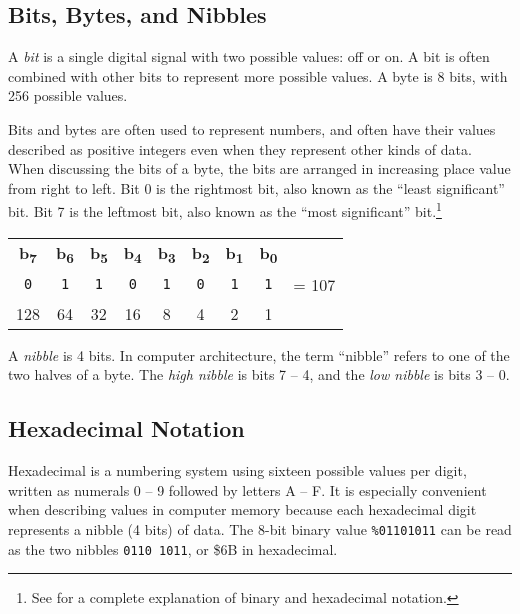 \subsection{Bits, Bytes, and Nibbles}

A {\em bit} is a single digital signal with two possible values: off or on. A
bit is often combined with other bits to represent more possible values. A byte
is 8 bits, with 256 possible values.

Bits and bytes are often used to represent numbers, and often have their
values described as positive integers even when they represent other kinds of
data. When discussing the bits of a byte, the bits are arranged in increasing
place value from right to left. Bit 0 is the rightmost bit, also known as the
``least significant'' bit.  Bit 7 is the leftmost bit, also known as the
``most significant'' bit.\footnote{See
 for a complete explanation of
binary and hexadecimal notation.}

\begin{center}
\begin{tabular}{ccccccccl}
{\bf b\textsubscript{7}} &
{\bf b\textsubscript{6}} &
{\bf b\textsubscript{5}} &
{\bf b\textsubscript{4}} &
{\bf b\textsubscript{3}} &
{\bf b\textsubscript{2}} &
{\bf b\textsubscript{1}} &
{\bf b\textsubscript{0}} & \\
\huge\texttt{0} &
\huge\texttt{1} &
\huge\texttt{1} &
\huge\texttt{0} &
\huge\texttt{1} &
\huge\texttt{0} &
\huge\texttt{1} &
\huge\texttt{1} & = 107 \\
\small{}128 &
\small{}64 &
\small{}32 &
\small{}16 &
\small{}8 &
\small{}4 &
\small{}2 &
\small{}1 & \\
\end{tabular}
\end{center}

A {\em nibble} is 4 bits. In computer architecture, the term ``nibble'' refers
to one of the two halves of a byte. The {\em high nibble} is bits 7 -- 4, and
the {\em low nibble} is bits 3 -- 0.

\subsection{Hexadecimal Notation}

Hexadecimal is a numbering system using sixteen possible values per digit,
written as numerals 0 -- 9 followed by letters A -- F. It is especially
convenient when describing values in computer memory because each hexadecimal digit
represents a nibble (4 bits) of data. The 8-bit binary value \texttt{\%01101011} can be
read as the two nibbles \texttt{0110 1011}, or \$6B in hexadecimal.

